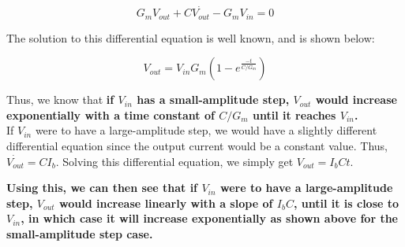 \documentclass{article}
\begin{document}
    \begin{equation}
        G_mV_{out} + C \dot{V_{out}} -G_mV_{in} = 0
    \end{equation}

    The solution to this differential equation is well known, and is shown below:

    \begin{equation}
        V_{out} = V_{in}G_m \left(1 - e^{\frac{-t}{C/G_m}} \right)
    \end{equation}

    Thus, we know that \textbf{if $V_{in}$ has a small-amplitude step, $V_{out}$ would increase exponentially with a time constant of $C/G_m$ until it reaches $V_{in}$.} \\

    If $V_{in}$ were to have a large-amplitude step, we would have a slightly different differential equation since the output current would be a constant value. Thus, $\dot{V_{out}} = CI_b$. Solving this differential equation, we simply get $V_{out} = I_bCt$. 
    
    \textbf{Using this, we can then see that if $V_{in}$ were to have a large-amplitude step, $V_{out}$ would increase linearly with a slope of $I_bC$, until it is close to $V_{in}$, in which case it will increase exponentially as shown above for the small-amplitude step case.}
\end{document}
